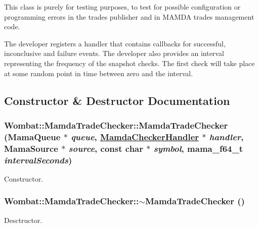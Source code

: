 This class is purely for testing purposes, to test for possible configuration or programming errors in the trades publisher and in MAMDA trades management code.

The developer registers a handler that contains callbacks for successful, inconclusive and failure events. The developer also provides an interval representing the frequency of the snapshot checks. The first check will take place at some random point in time between zero and the interval. 



\subsection{Constructor \& Destructor Documentation}
\hypertarget{classWombat_1_1MamdaTradeChecker_9964b7fcd51f6da299c0188501bf0737}{
\subsubsection[MamdaTradeChecker]{\setlength{\rightskip}{0pt plus 5cm}Wombat::Mamda\-Trade\-Checker::Mamda\-Trade\-Checker (Mama\-Queue $\ast$ {\em queue}, \hyperlink{classWombat_1_1MamdaCheckerHandler}{Mamda\-Checker\-Handler} $\ast$ {\em handler}, Mama\-Source $\ast$ {\em source}, const char $\ast$ {\em symbol}, mama\_\-f64\_\-t {\em interval\-Seconds})}}
\label{classWombat_1_1MamdaTradeChecker_9964b7fcd51f6da299c0188501bf0737}


Constructor. 

\hypertarget{classWombat_1_1MamdaTradeChecker_2eae95f41e52377a28985bb3adf25079}{
\subsubsection[$\sim$MamdaTradeChecker]{\setlength{\rightskip}{0pt plus 5cm}Wombat::Mamda\-Trade\-Checker::$\sim$Mamda\-Trade\-Checker ()}}
\label{classWombat_1_1MamdaTradeChecker_2eae95f41e52377a28985bb3adf25079}


Desctructor. 



